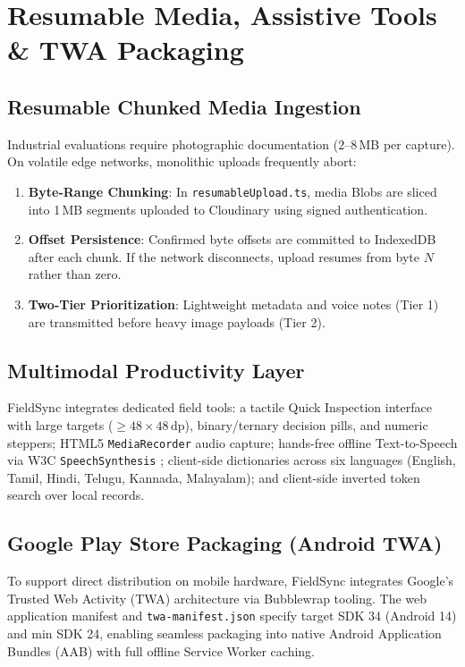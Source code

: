 \documentclass[conference]{IEEEtran}
\begin{document}
\section{Resumable Media, Assistive Tools \& TWA Packaging}

\subsection{Resumable Chunked Media Ingestion}
Industrial evaluations require photographic documentation ($2\text{--}8$\,MB per capture). On volatile edge networks, monolithic uploads frequently abort:
\begin{enumerate}\setlength{\itemsep}{1pt}
    \item \textbf{Byte-Range Chunking}: In \texttt{resumableUpload.ts}, media Blobs are sliced into 1\,MB segments uploaded to Cloudinary using signed authentication.
    \item \textbf{Offset Persistence}: Confirmed byte offsets are committed to IndexedDB after each chunk. If the network disconnects, upload resumes from byte $N$ rather than zero.
    \item \textbf{Two-Tier Prioritization}: Lightweight metadata and voice notes (Tier 1) are transmitted before heavy image payloads (Tier 2).
\end{enumerate}

\subsection{Multimodal Productivity Layer}
FieldSync integrates dedicated field tools: a tactile Quick Inspection interface with large targets ($\ge 48 \times 48$\,dp), binary/ternary decision pills, and numeric steppers; HTML5 \texttt{MediaRecorder} audio capture; hands-free offline Text-to-Speech via W3C \texttt{SpeechSynthesis} \cite{w3c_webspeech}; client-side dictionaries across six languages (English, Tamil, Hindi, Telugu, Kannada, Malayalam); and client-side inverted token search over local records.

\subsection{Google Play Store Packaging (Android TWA)}
To support direct distribution on mobile hardware, FieldSync integrates Google's Trusted Web Activity (TWA) architecture \cite{google_twa, w3c_pwa} via Bubblewrap tooling. The web application manifest and \texttt{twa-manifest.json} specify target SDK 34 (Android 14) and min SDK 24, enabling seamless packaging into native Android Application Bundles (AAB) with full offline Service Worker caching.
\end{document}
